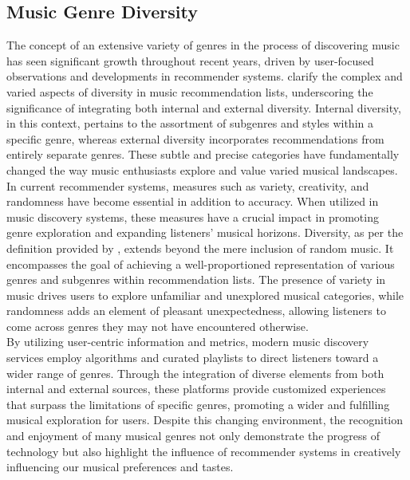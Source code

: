 \subsection{Music Genre Diversity}
The concept of an extensive variety of genres in the process of discovering music has seen significant growth throughout recent years, driven by user-focused observations and developments in recommender systems. \textcite{robinson20} clarify the complex and varied aspects of diversity in music recommendation lists, underscoring the significance of integrating both internal and external diversity. Internal diversity, in this context, pertains to the assortment of subgenres and styles within a specific genre, whereas external diversity incorporates recommendations from entirely separate genres. These subtle and precise categories have fundamentally changed the way music enthusiasts explore and value varied musical landscapes. \\

In current recommender systems, measures such as variety, creativity, and randomness have become essential in addition to accuracy. When utilized in music discovery systems, these measures have a crucial impact in promoting genre exploration and expanding listeners' musical horizons. Diversity, as per the definition provided by \textcite{robinson20}, extends beyond the mere inclusion of random music. It encompasses the goal of achieving a well-proportioned representation of various genres and subgenres within recommendation lists. The presence of variety in music drives users to explore unfamiliar and unexplored musical categories, while randomness adds an element of pleasant unexpectedness, allowing listeners to come across genres they may not have encountered otherwise. \\

By utilizing user-centric information and metrics, modern music discovery services employ algorithms and curated playlists to direct listeners toward a wider range of genres. Through the integration of diverse elements from both internal and external sources, these platforms provide customized experiences that surpass the limitations of specific genres, promoting a wider and fulfilling musical exploration for users. Despite this changing environment, the recognition and enjoyment of many musical genres not only demonstrate the progress of technology but also highlight the influence of recommender systems in creatively influencing our musical preferences and tastes.


